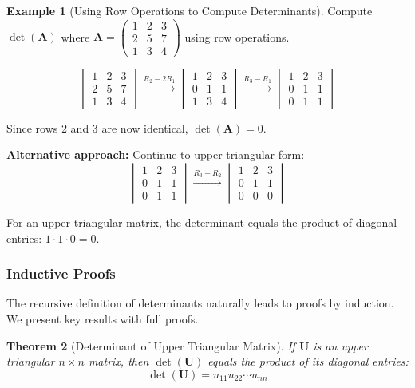 \documentclass[12pt]{article}
\numberwithin{equation}{section}
\newcommand{\mat}[1]{\mathbf{#1}}        %
\theoremstyle{plain}
\newtheorem{theorem}{Theorem}[section]
\theoremstyle{definition}
\newtheorem{example}[theorem]{Example}
\theoremstyle{remark}
\begin{document}
\begin{example}[Using Row Operations to Compute Determinants]
Compute $\det(\mat{A})$ where $\mat{A} = \begin{pmatrix} 1 & 2 & 3 \\ 2 & 5 & 7 \\ 1 & 3 & 4 \end{pmatrix}$ using row operations.

$$\begin{vmatrix} 1 & 2 & 3 \\ 2 & 5 & 7 \\ 1 & 3 & 4 \end{vmatrix} \xrightarrow{R_2 - 2R_1} \begin{vmatrix} 1 & 2 & 3 \\ 0 & 1 & 1 \\ 1 & 3 & 4 \end{vmatrix} \xrightarrow{R_3 - R_1} \begin{vmatrix} 1 & 2 & 3 \\ 0 & 1 & 1 \\ 0 & 1 & 1 \end{vmatrix}$$

Since rows 2 and 3 are now identical, $\det(\mat{A}) = 0$.

\textbf{Alternative approach:} Continue to upper triangular form:
$$\begin{vmatrix} 1 & 2 & 3 \\ 0 & 1 & 1 \\ 0 & 1 & 1 \end{vmatrix} \xrightarrow{R_3 - R_2} \begin{vmatrix} 1 & 2 & 3 \\ 0 & 1 & 1 \\ 0 & 0 & 0 \end{vmatrix}$$

For an upper triangular matrix, the determinant equals the product of diagonal entries: $1 \cdot 1 \cdot 0 = 0$.
\end{example}

\subsubsection{Inductive Proofs}

The recursive definition of determinants naturally leads to proofs by induction. We present key results with full proofs.

\begin{theorem}[Determinant of Upper Triangular Matrix]
If $\mat{U}$ is an upper triangular $n \times n$ matrix, then $\det(\mat{U})$ equals the product of its diagonal entries:
$$\det(\mat{U}) = u_{11}u_{22} \cdots u_{nn}$$
\end{theorem}
\end{document}
